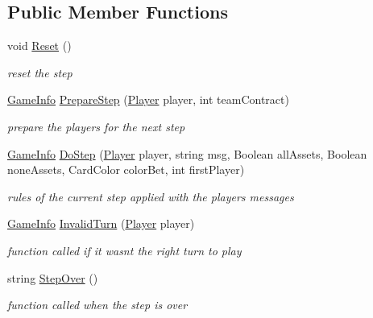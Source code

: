 \subsection*{Public Member Functions}
\begin{DoxyCompactItemize}
\item 
void \hyperlink{interface_coinche_1_1_i_step_a764f20494a35e9b006c6495a38717e9a}{Reset} ()
\begin{DoxyCompactList}\small\item\em reset the step \end{DoxyCompactList}\item 
\hyperlink{class_coinche_1_1_tools_1_1_game_info}{Game\+Info} \hyperlink{interface_coinche_1_1_i_step_ada17a0e471c5afbc7e4f4acc434cdd76}{Prepare\+Step} (\hyperlink{class_coinche_1_1_player}{Player} player, int team\+Contract)
\begin{DoxyCompactList}\small\item\em prepare the players for the next step \end{DoxyCompactList}\item 
\hyperlink{class_coinche_1_1_tools_1_1_game_info}{Game\+Info} \hyperlink{interface_coinche_1_1_i_step_a1b410159a7988ae4e75154539715e7ba}{Do\+Step} (\hyperlink{class_coinche_1_1_player}{Player} player, string msg, Boolean all\+Assets, Boolean none\+Assets, Card\+Color color\+Bet, int first\+Player)
\begin{DoxyCompactList}\small\item\em rules of the current step applied with the players messages \end{DoxyCompactList}\item 
\hyperlink{class_coinche_1_1_tools_1_1_game_info}{Game\+Info} \hyperlink{interface_coinche_1_1_i_step_afc64813670860f5ee0829264751abc0a}{Invalid\+Turn} (\hyperlink{class_coinche_1_1_player}{Player} player)
\begin{DoxyCompactList}\small\item\em function called if it wasn\textquotesingle{}t the right turn to play \end{DoxyCompactList}\item 
string \hyperlink{interface_coinche_1_1_i_step_a86ef55b4c36ffa27f5fa18a10e9a61a0}{Step\+Over} ()
\begin{DoxyCompactList}\small\item\em function called when the step is over \end{DoxyCompactList}\end{DoxyCompactItemize}


